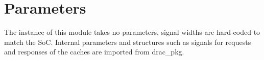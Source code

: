 \section{Parameters}
\label{chapter3}

The instance of this module takes no parameters, signal widths are hard-coded to match the SoC.
Internal parameters and structures such as signals for requests and responses of the caches are imported from drac\_pkg.